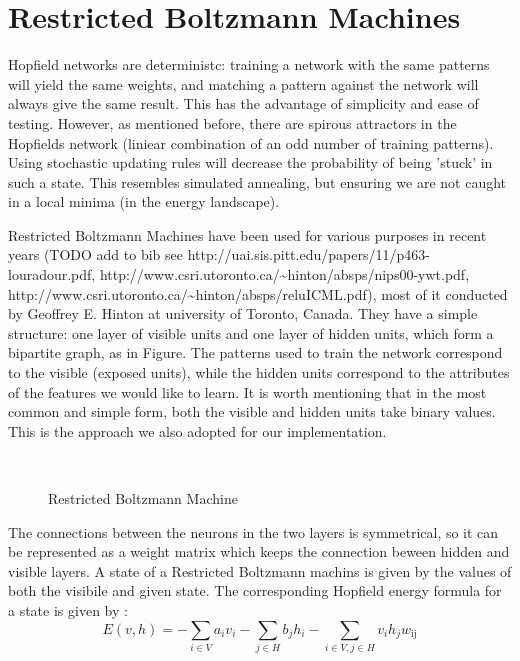 
\newcommand{\nocomma}{}
\newcommand{\noplus}{}
\newcommand{\tmop}[1]{\ensuremath{\operatorname{#1}}}
\newcommand{\tmtextbf}[1]{{\bfseries{#1}}}
\newcommand{\tmtextit}[1]{{#1}}
\newcommand{\tmtexttt}[1]{{\ttfamily{#1}}}
\newenvironment{descriptioncompact}{\begin{description} }{\end{description}}


\section{Restricted Boltzmann Machines}

Hopfield networks are deterministc: training a network with the same patterns
will yield the same weights, and matching a pattern against the network will
always give the same result. This has the advantage of simplicity and ease of
testing. However, as mentioned before, there are spirous attractors in the
Hopfields network (liniear combination of an odd number of training patterns).
Using stochastic updating rules will decrease the probability of being 'stuck'
in such a state. This resembles simulated annealing, but ensuring we are not
caught in a local minima (in the energy landscape).

Restricted Boltzmann Machines have been used for various purposes in recent
years (TODO add to bib see
http://uai.sis.pitt.edu/papers/11/p463-louradour.pdf,
http://www.csri.utoronto.ca/\~{ }hinton/absps/nips00-ywt.pdf,
http://www.csri.utoronto.ca/\~{ }hinton/absps/reluICML.pdf), most of it
conducted by Geoffrey E. Hinton at university of Toronto, Canada. They have a
simple structure: one layer of visible units and one layer of hidden units,
which form a bipartite graph, as in Figure. The patterns used to train the
network correspond to the visible (exposed units), while the hidden units
correspond to the attributes of the features we would like to learn. It is
worth mentioning that in the most common and simple form, both the visible and
hidden units take binary values. This is the approach we also adopted for our
implementation.

\ \ \ \ \ \ \ \ \ \ \ \ \ \ \ \ \ \ \ \ \ \ \ \ \ \ \ \ \begin{figure}[h]
  \caption{Restricted Boltzmann Machine}
\end{figure}


The connections between the neurons in the two layers is symmetrical, so it
can be represented as a weight matrix which keeps the connection beween hidden
and visible layers. A state of a Restricted Boltzmann machins is given by the
values of both the visibile and given state. The corresponding Hopfield energy
formula for a state is given by :
\[ E (v, h) = - \sum_{i \in V} a_i v_i - \sum_{j \in H} b_j h_i - \sum_{i \in
   V, \nocomma j \in H \nocomma} v_i h_j w_{\tmtextit{\tmtextit{\tmop{ij}}}}
\]


